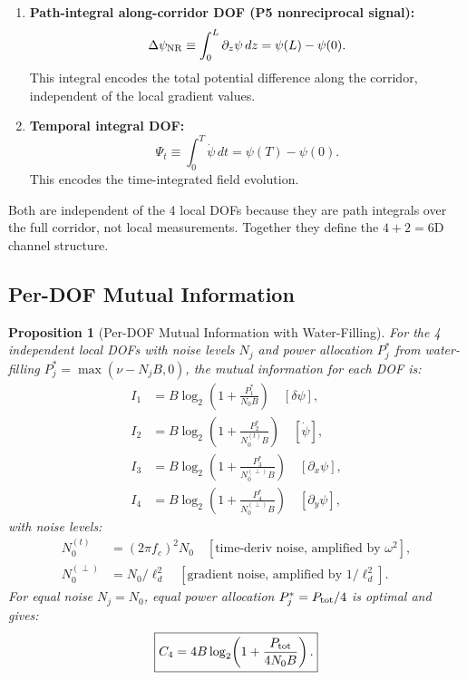 \documentclass[aps,prd,twocolumn,superscriptaddress,nofootinbib]{revtex4-2}
\newtheorem{proposition}[theorem]{Proposition}
\begin{document}
\begin{enumerate}
\item \textbf{Path-integral along-corridor DOF (P5 nonreciprocal signal):}
\begin{equation}
\Delta\psi_{\rm NR} \equiv \int_0^L \partial_z\psi \, dz = \psi(L) - \psi(0).
\end{equation}
This integral encodes the total potential difference along the corridor,
independent of the local gradient values.

\item \textbf{Temporal integral DOF:}
\begin{equation}
\Psi_t \equiv \int_0^T \dot\psi \, dt = \psi(T) - \psi(0).
\end{equation}
This encodes the time-integrated field evolution.
\end{enumerate}

Both are independent of the 4 local DOFs because they are path integrals
over the full corridor, not local measurements. Together they define
the $4 + 2 = 6$D channel structure.

\subsection{Per-DOF Mutual Information}

\begin{proposition}[Per-DOF Mutual Information with Water-Filling]
\label{prop:per-dof}
For the 4 independent local DOFs with noise levels
$N_j$ and power allocation $P_j^*$ from water-filling
$P_j^* = \max(\nu - N_j B, 0)$, the mutual information for each
DOF is:
\begin{align}
I_1 &= B\log_2\!\left(1 + \frac{P_1^*}{N_0 B}\right) \quad[\delta\psi], \\
I_2 &= B\log_2\!\left(1 + \frac{P_2^*}{N_0^{(t)} B}\right) \quad[\dot\psi], \\
I_3 &= B\log_2\!\left(1 + \frac{P_3^*}{N_0^{(\perp)} B}\right) \quad[\partial_x\psi], \\
I_4 &= B\log_2\!\left(1 + \frac{P_4^*}{N_0^{(\perp)} B}\right) \quad[\partial_y\psi],
\end{align}
with noise levels:
\begin{align}
N_0^{(t)} &= (2\pi f_c)^2 N_0 \quad [\text{time-deriv noise, amplified by }\omega^2], \\
N_0^{(\perp)} &= N_0 / \ell_d^2 \quad [\text{gradient noise, amplified by }1/\ell_d^2].
\end{align}
For equal noise $N_j = N_0$, equal power allocation $P_j^* = P_{\rm tot}/4$ is
optimal and gives:
\begin{equation}
\boxed{
C_4 = 4B\log_2\!\left(1 + \frac{P_{\rm tot}}{4 N_0 B}\right).
}
\label{eq:C4}
\end{equation}
\end{proposition}
\end{document}
